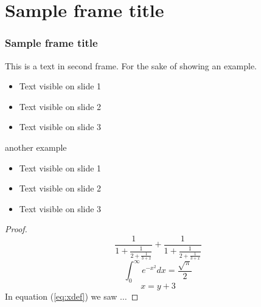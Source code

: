 \documentclass[aspectratio=169]{beamer}
\begin{document}
\section{Sample frame title}


\begin{frame}
\frametitle{Sample frame title}
This is a text in second frame.
For the sake of showing an example.

\begin{itemize}
 \item Text visible on slide 1
 \item Text visible on slide 2
 \item Text visible on slide 3
\end{itemize}

\vspace{0.3cm}

another example

\begin{itemize}\itemsep0em
 \item Text visible on slide 1
 \item Text visible on slide 2
 \item Text visible on slide 3
\end{itemize}
\end{frame}

\begin{frame}
  \begin{proof}
    $$
 \frac{1}{\displaystyle 1+
   \frac{1}{\displaystyle 2+
   \frac{1}{\displaystyle 3+x}}} +
 \frac{1}{1+\frac{1}{2+\frac{1}{3+x}}}
$$
$$\int_0^\infty e^{-x^2} dx=\frac{\sqrt{\pi}}{2}$$
\begin{equation} x=y+3 \label{eq:xdef}
\end{equation}
In equation (\ref{eq:xdef}) we saw $\dots$
  \end{proof}
\end{frame}
\end{document}

